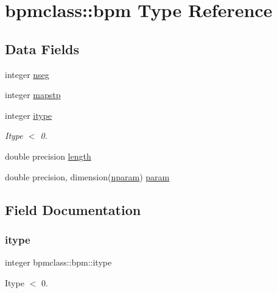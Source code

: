 \hypertarget{structbpmclass_1_1bpm}{}\section{bpmclass\+::bpm Type Reference}
\label{structbpmclass_1_1bpm}
\subsection*{Data Fields}
\begin{DoxyCompactItemize}
\item 
integer \mbox{\hyperlink{structbpmclass_1_1bpm_af47828f23a39ecfbef81048d780c4107}{nseg}}
\item 
integer \mbox{\hyperlink{structbpmclass_1_1bpm_a57b5d567476a69c20de780f6fb8d0a2e}{mapstp}}
\item 
integer \mbox{\hyperlink{structbpmclass_1_1bpm_a8759ea53c8b66bbdb08055405fff79a0}{itype}}
\begin{DoxyCompactList}\small\item\em Itype $<$ 0. \end{DoxyCompactList}\item 
double precision \mbox{\hyperlink{structbpmclass_1_1bpm_a91bf471e42c1c733f27253fe367c02e1}{length}}
\item 
double precision, dimension(\mbox{\hyperlink{namespacebpmclass_ac2f2f373976236d08c9c68de895950eb}{nparam}}) \mbox{\hyperlink{structbpmclass_1_1bpm_ab4cbff356dd68d8a0563cb3b1d4ae235}{param}}
\end{DoxyCompactItemize}


\subsection{Field Documentation}
\mbox{\label{structbpmclass_1_1bpm_a8759ea53c8b66bbdb08055405fff79a0}} 
\subsubsection{\texorpdfstring{itype}{itype}}
{\footnotesize\ttfamily integer bpmclass\+::bpm\+::itype}



Itype $<$ 0. 

\mbox{\label{structbpmclass_1_1bpm_a91bf471e42c1c733f27253fe367c02e1}} 
